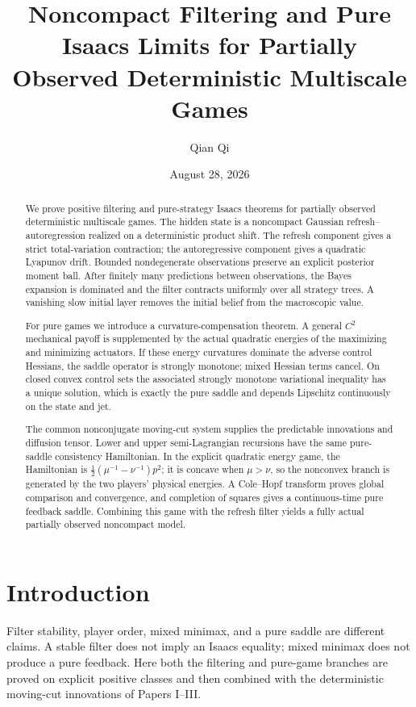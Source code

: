 \documentclass[11pt,reqno]{amsart}
\title[Noncompact filtering and pure Isaacs limits]{Noncompact Filtering and Pure Isaacs Limits for Partially Observed Deterministic Multiscale Games}
\author{Qian Qi}
\date{August 28, 2026}
\theoremstyle{definition}
\theoremstyle{remark}
\begin{document}
\begin{abstract}
We prove positive filtering and pure-strategy Isaacs theorems for partially
observed deterministic multiscale games.  The hidden state is a noncompact
Gaussian refresh--autoregression realized on a deterministic product shift.
The refresh component gives a strict total-variation contraction; the
autoregressive component gives a quadratic Lyapunov drift.  Bounded
nondegenerate observations preserve an explicit posterior moment ball.  After
finitely many predictions between observations, the Bayes expansion is
dominated and the filter contracts uniformly over all strategy trees.  A
vanishing slow initial layer removes the initial belief from the macroscopic
value.

For pure games we introduce a curvature-compensation theorem.  A general
$C^2$ mechanical payoff is supplemented by the actual quadratic energies of
the maximizing and minimizing actuators.  If these energy curvatures dominate
the adverse control Hessians, the saddle operator is strongly monotone; mixed
Hessian terms cancel.  On closed convex control sets the associated strongly
monotone variational inequality has a unique solution, which is exactly the
pure saddle and depends Lipschitz continuously on the state and jet.

The common nonconjugate moving-cut system supplies the predictable innovations
and diffusion tensor.  Lower and upper semi-Lagrangian recursions have the same
pure-saddle consistency Hamiltonian.  In the explicit quadratic energy game,
the Hamiltonian is
$\frac12(\mu^{-1}-\nu^{-1})p^2$; it is concave when $\mu>\nu$, so the
nonconvex branch is generated by the two players' physical energies.  A
Cole--Hopf transform proves global comparison and convergence, and completion
of squares gives a continuous-time pure feedback saddle.  Combining this game
with the refresh filter yields a fully actual partially observed noncompact
model.
\end{abstract}
\maketitle
\tableofcontents

\section{Introduction}
Filter stability, player order, mixed minimax, and a pure saddle are different
claims.  A stable filter does not imply an Isaacs equality; mixed minimax does
not produce a pure feedback.  Here both the filtering and pure-game branches
are proved on explicit positive classes and then combined with the deterministic
moving-cut innovations of Papers I--III.
\end{document}
